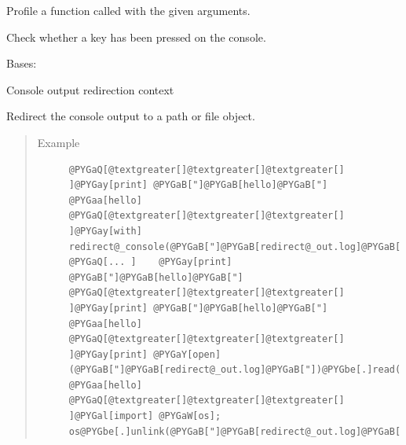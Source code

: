 \documentclass[letterpaper,10pt,english]{sphinxmanual}
\begin{document}

\begin{fulllineitems}
\label{api/util:refl1d.util.profile}
Profile a function called with the given arguments.

\end{fulllineitems}


\begin{fulllineitems}
\label{api/util:refl1d.util.kbhit}
Check whether a key has been pressed on the console.

\end{fulllineitems}


\begin{fulllineitems}
\label{api/util:refl1d.util.redirect_console}
Bases: 

Console output redirection context

Redirect the console output to a path or file object.
\begin{quote}\begin{description}
\item[{Example }] \leavevmode
\begin{Verbatim}[commandchars=@\[\]]
@PYGaQ[@textgreater[]@textgreater[]@textgreater[] ]@PYGay[print] @PYGaB["]@PYGaB[hello]@PYGaB["]
@PYGaa[hello]
@PYGaQ[@textgreater[]@textgreater[]@textgreater[] ]@PYGay[with] redirect@_console(@PYGaB["]@PYGaB[redirect@_out.log]@PYGaB["]):
@PYGaQ[... ]    @PYGay[print] @PYGaB["]@PYGaB[hello]@PYGaB["]
@PYGaQ[@textgreater[]@textgreater[]@textgreater[] ]@PYGay[print] @PYGaB["]@PYGaB[hello]@PYGaB["]
@PYGaa[hello]
@PYGaQ[@textgreater[]@textgreater[]@textgreater[] ]@PYGay[print] @PYGaY[open](@PYGaB["]@PYGaB[redirect@_out.log]@PYGaB["])@PYGbe[.]read()@PYGZlb[]:@PYGbe[-]@PYGaw[1]@PYGZrb[]
@PYGaa[hello]
@PYGaQ[@textgreater[]@textgreater[]@textgreater[] ]@PYGal[import] @PYGaW[os]; os@PYGbe[.]unlink(@PYGaB["]@PYGaB[redirect@_out.log]@PYGaB["])
\end{Verbatim}

\end{description}\end{quote}

\end{fulllineitems}
\end{document}

